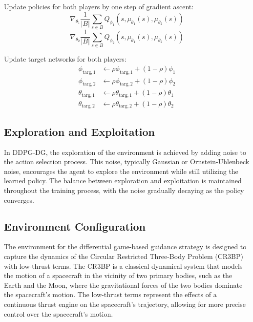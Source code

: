 \documentclass[conference]{IEEEtran}
\begin{document}
\begin{algorithm}[H]
\begin{algorithmic}[1]
                \STATE Update policies for both players by one step of gradient ascent:
                \begin{equation*}
                    \nabla_{\theta_1} \frac{1}{|B|} \sum_{s \in B} Q_{\phi_1}(s, \mu_{\theta_1}(s), \mu_{\theta_2}(s))
                \end{equation*}
                \begin{equation*}
                    \nabla_{\theta_2} \frac{1}{|B|} \sum_{s \in B} Q_{\phi_2}(s, \mu_{\theta_1}(s), \mu_{\theta_2}(s))
                \end{equation*}

                \STATE Update target networks for both players:
                \begin{align*}
                    \phi_{\text{targ},1} &\leftarrow \rho \phi_{\text{targ},1} + (1 - \rho) \phi_1 \\
                    \phi_{\text{targ},2} &\leftarrow \rho \phi_{\text{targ},2} + (1 - \rho) \phi_2 \\
                    \theta_{\text{targ},1} &\leftarrow \rho \theta_{\text{targ},1} + (1 - \rho) \theta_1 \\
                    \theta_{\text{targ},2} &\leftarrow \rho \theta_{\text{targ},2} + (1 - \rho) \theta_2
                \end{align*}
            \ENDFOR
        \ENDIF
\end{algorithmic}
\end{algorithm}





\subsection{Exploration and Exploitation}
In DDPG-DG, the exploration of the environment is achieved by adding noise to the action selection process. This noise, typically Gaussian or Ornstein-Uhlenbeck noise, encourages the agent to explore the environment while still utilizing the learned policy. The balance between exploration and exploitation is maintained throughout the training process, with the noise gradually decaying as the policy converges.






\subsection{Environment Configuration}
The environment for the differential game-based guidance strategy is designed to capture the dynamics of the Circular Restricted Three-Body Problem (CR3BP) with low-thrust terms. The CR3BP is a classical dynamical system that models the motion of a spacecraft in the vicinity of two primary bodies, such as the Earth and the Moon, where the gravitational forces of the two bodies dominate the spacecraft's motion. The low-thrust terms represent the effects of a continuous thrust engine on the spacecraft's trajectory, allowing for more precise control over the spacecraft's motion.
\end{document}
